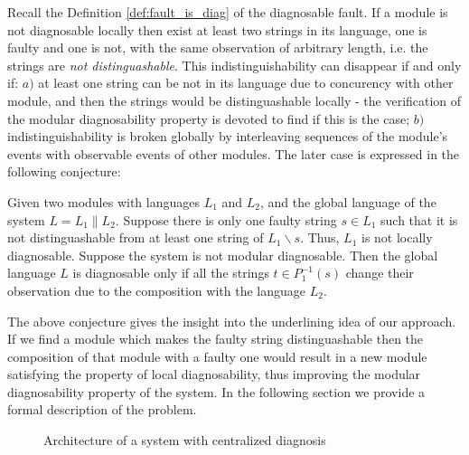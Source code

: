 \documentclass[a4paper, 10pt, conference]{ieeeconf}
\begin{document}
Recall the Definition \ref{def:fault_is_diag} of the diagnosable fault. If a
module is not diagnosable locally then exist at least two strings in its
language, one is faulty and one is not, with the same observation of arbitrary
length, i.e. the strings are \emph{not distinguashable}. This
indistinguishability can disappear if and only if:
$a)$ at least one string can be not in its language due to concurency with other
module, and then the strings would be distinguashable locally - the verification
of the modular diagnosability property is devoted to find if this is the case;
$b)$ indistinguishability is broken globally by interleaving sequences of the
module's events with observable events of other modules. The later case is
expressed in the following conjecture:
\begin{conjecture} Given two modules with languages $L_1$ and $L_2$, and the
global language of the system $L = L_1 \parallel L_2$. Suppose there is only one
faulty string $s \in L_1$ such that it is not distinguashable from at least one
string of $L_1\backslash s$. Thus, $L_1$ is not locally diagnosable. Suppose the
system is not modular diagnosable. Then the global language $L$ is diagnosable
only if all the strings $t \in P_1^{-1}(s)$ change their observation due to 
the composition with the language $L_2$.
\end{conjecture}

The above conjecture gives the insight into the underlining idea of our
approach. If we find a module which makes the faulty string distinguashable
then the composition of that module with a faulty one would result in a new
module satisfying the property of local diagnosability, thus improving
the modular diagnosability property of the system. In the following section we
provide a formal description of the problem.



\begin{figure}[t]
\centering
{}
\caption{Architecture of a system with centralized diagnosis}
\label{fig_centralized}
\end{figure}
\end{document}
